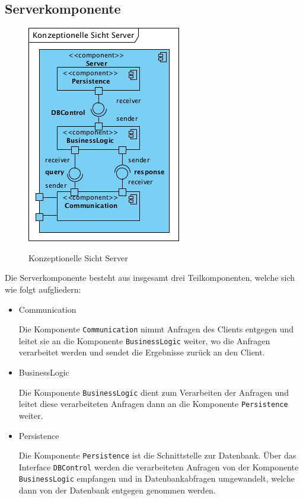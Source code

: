 \documentclass[fontsize=12pt,paper=a4,twoside]{scrartcl}
\begin{document}
\subsection{Serverkomponente}
\label{sec:server}

\begin{figure} [H] 
\caption{Konzeptionelle Sicht Server}  \centering
	\includegraphics[scale=1.85]{Diagramme/KonzeptionelleSichtServer.png} 
	\label{pic:konzeptionellesichtserver} 
\end{figure}

Die Serverkomponente besteht aus insgesamt drei Teilkomponenten, welche sich wie folgt aufgliedern:

\begin{itemize}
\item{Communication}

Die Komponente \texttt{Communication} nimmt Anfragen des Clients entgegen und leitet sie an die Komponente \texttt{BusinessLogic} weiter, wo die Anfragen verarbeitet werden und sendet die Ergebnisse zurück an den Client.

\item{BusinessLogic}

Die Komponente \texttt{BusinessLogic} dient zum Verarbeiten der Anfragen und leitet diese verarbeiteten Anfragen dann an die Komponente \texttt{Persistence} weiter.

\item{Persistence}

Die Komponente \texttt{Persistence} ist die Schnittstelle zur Datenbank. Über das Interface \texttt{DBControl} werden die verarbeiteten Anfragen von der Komponente \texttt{BusinessLogic} empfangen und in Datenbankabfragen umgewandelt, welche dann von der Datenbank entgegen genommen werden.

\end{itemize}
\end{document}
